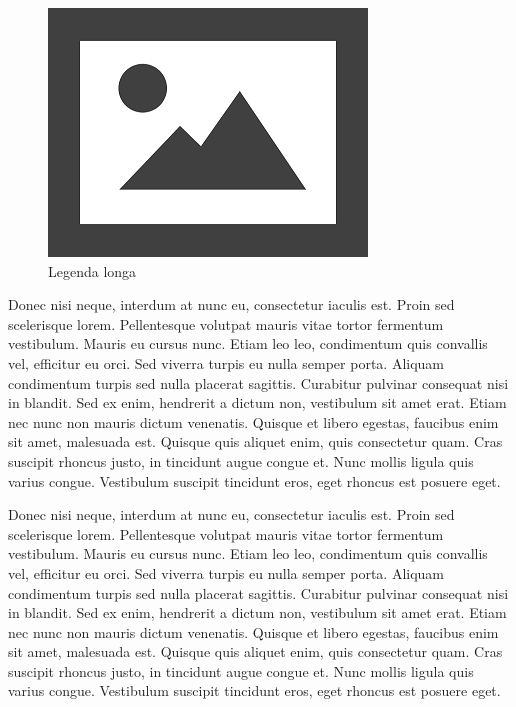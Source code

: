 \documentclass[12pt]{article}
\begin{document}
\begin{figure}[H]
	\centering
	\includegraphics[width=0.7\linewidth]{Figuras/fig2}
	\caption[Legenda curta]{Legenda longa}
	\label{fig:figura genérica}
\end{figure}


Donec nisi neque, interdum at nunc eu, consectetur iaculis est. Proin sed scelerisque lorem. Pellentesque volutpat mauris vitae tortor fermentum vestibulum. Mauris eu cursus nunc. Etiam leo leo, condimentum quis convallis vel, efficitur eu orci. Sed viverra turpis eu nulla semper porta. Aliquam condimentum turpis sed nulla placerat sagittis. Curabitur pulvinar consequat nisi in blandit. Sed ex enim, hendrerit a dictum non, vestibulum sit amet erat. Etiam nec nunc non mauris dictum venenatis. Quisque et libero egestas, faucibus enim sit amet, malesuada est. Quisque quis aliquet enim, quis consectetur quam. Cras suscipit rhoncus justo, in tincidunt augue congue et. Nunc mollis ligula quis varius congue. Vestibulum suscipit tincidunt eros, eget rhoncus est posuere eget.

Donec nisi neque, interdum at nunc eu, consectetur iaculis est. Proin sed scelerisque lorem. Pellentesque volutpat mauris vitae tortor fermentum vestibulum. Mauris eu cursus nunc. Etiam leo leo, condimentum quis convallis vel, efficitur eu orci. Sed viverra turpis eu nulla semper porta. Aliquam condimentum turpis sed nulla placerat sagittis. Curabitur pulvinar consequat nisi in blandit. Sed ex enim, hendrerit a dictum non, vestibulum sit amet erat. Etiam nec nunc non mauris dictum venenatis. Quisque et libero egestas, faucibus enim sit amet, malesuada est. Quisque quis aliquet enim, quis consectetur quam. Cras suscipit rhoncus justo, in tincidunt augue congue et. Nunc mollis ligula quis varius congue. Vestibulum suscipit tincidunt eros, eget rhoncus est posuere eget.
\end{document}
